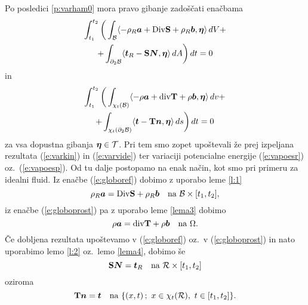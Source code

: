 Po posledici \ref{p:varham0} mora pravo gibanje zadoščati enačbama
\begin{multline} \label{e:globoref}
	\int_{t_1}^{t_2}\bigg( \int_{\mathcal B}\langle -\rho_R\boldsymbol a+
	\mathrm {Div}\mathbf S+\rho_R\boldsymbol b,\boldsymbol \eta\rangle \,dV+ \\
	+\int_{\partial_2 \mathcal B}\langle\boldsymbol t_R-\mathbf S\boldsymbol N,\boldsymbol \eta\rangle\,dA\bigg)\,dt=0
\end{multline}
in
\begin{multline} \label{e:globoprost}
	\int_{t_1}^{t_2}\bigg( \int_{\chi_t(\mathcal B)}\langle -\rho\boldsymbol a+
	\mathrm{div}\mathbf T+\rho\boldsymbol b,\boldsymbol \eta\rangle\,dv+ \\
	+\int_{\chi_t(\partial_2 \mathcal B)}\langle\boldsymbol t-\mathbf T\boldsymbol n,\boldsymbol \eta\rangle\,ds\bigg)\,dt=0
\end{multline}
za vsa dopustna gibanja $\boldsymbol \eta\in\mathcal{T}$. Pri tem smo zopet upoštevali
že prej izpeljana rezultata (\ref{e:varkin}) in (\ref{e:varvide}) ter
variaciji potencialne energije (\ref{e:vapoesr}) oz.~(\ref{e:vapoesp}).
Od tu dalje postopamo na enak način, kot smo pri primeru za idealni fluid.
Iz enačbe (\ref{e:globoref}) dobimo z uporabo leme \ref{l:1}
\begin{equation*}
	\rho_R\vek{a}=\Div\ten{S}+\rho_R\vek{b}\quad\textrm{na}\ \B\times[t_1,t_2],
\end{equation*}
iz enačbe (\ref{e:globoprost}) pa z uporabo leme \ref{lema3} dobimo
\begin{equation*}
	\rho\vek{a}=\div\ten{T}+\rho\vek{b}\quad\textrm{na}\ \Omega.
\end{equation*}
Če dobljena rezultata upoštevamo v (\ref{e:globoref}) oz.~v (\ref{e:globoprost}) in
nato uporabimo lemo \ref{l:2} oz.~lemo \ref{lema4}, dobimo še
\begin{equation*}
	\ten{S}\vek{N}=\vek{t}_R\quad\textrm{na}\ \mathcal{R}\times[t_1,t_2]
\end{equation*}
oziroma
\begin{equation*}
	\ten{T}\vek{n}=\vek{t}\quad\textrm{na}\ \{(x,t)\,;\ x\in\chi_t(\mathcal{R}),\ t\in[t_1,t_2] \}.
\end{equation*}